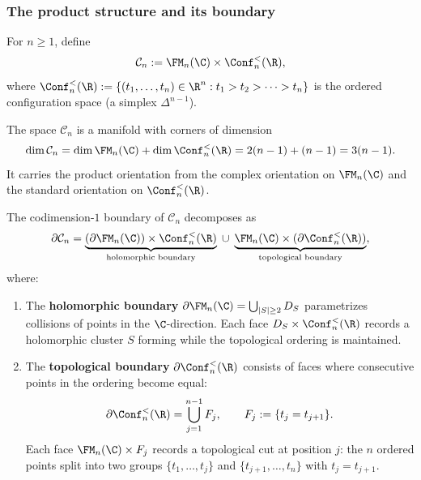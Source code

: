 \subsubsection{The product structure and its boundary}

\begin{definition}
For $n \ge 1$, define
\begin{equation}%
\mathcal{C}_n
:= \FM_n(\C) \times \Conf_n^<(\R),
\end{equation}
where $\Conf_n^<(\R) := \{(t_1, \ldots, t_n) \in \R^n
: t_1 > t_2 > \cdots > t_n\}$ is the ordered
configuration space (a simplex $\Delta^{n-1}$).

The space $\mathcal{C}_n$ is a manifold with corners of
dimension
\[
\dim \mathcal{C}_n
= \dim \FM_n(\C) + \dim \Conf_n^<(\R)
= 2(n-1) + (n-1)
= 3(n-1).
\]
It carries the product orientation from the complex
orientation on $\FM_n(\C)$ and the standard orientation
on $\Conf_n^<(\R)$.
\end{definition}

\begin{proposition}
The codimension-$1$ boundary of $\mathcal{C}_n$ decomposes
as
\begin{equation}%
\partial \mathcal{C}_n
= \underbrace{(\partial \FM_n(\C)) \times
\Conf_n^<(\R)}_{\text{holomorphic boundary}}
\;\cup\;
\underbrace{\FM_n(\C) \times
(\partial \Conf_n^<(\R))}_{\text{topological boundary}},
\end{equation}
where:
\begin{enumerate}[label=\textup{(\roman*)}]
\item The \textbf{holomorphic boundary}
$\partial \FM_n(\C) = \bigcup_{|S| \ge 2} D_S$
parametrizes collisions of points in the $\C$-direction.
Each face $D_S \times \Conf_n^<(\R)$ records a
holomorphic cluster $S$ forming while the topological
ordering is maintained.

\item The \textbf{topological boundary}
$\partial \Conf_n^<(\R)$ consists of faces where
consecutive points in the ordering become equal:
\[
\partial \Conf_n^<(\R)
= \bigcup_{j=1}^{n-1} F_j,
\qquad
F_j := \{t_j = t_{j+1}\}.
\]
Each face $\FM_n(\C) \times F_j$ records a topological
cut at position $j$: the $n$ ordered points split
into two groups $\{t_1, \ldots, t_j\}$ and
$\{t_{j+1}, \ldots, t_n\}$ with $t_j = t_{j+1}$.
\end{enumerate}
\end{proposition}

